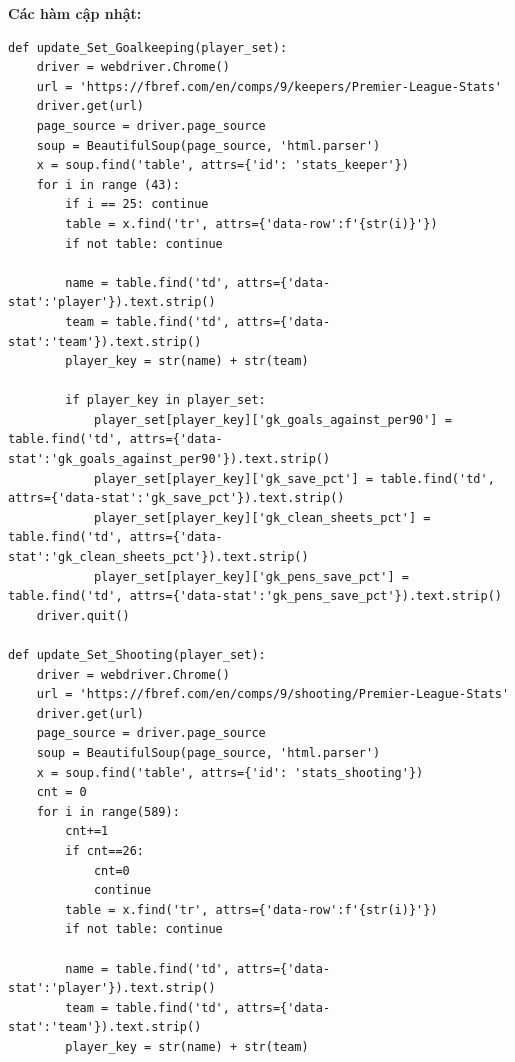 \documentclass[12pt]{report}
\begin{document}
{\textbf*{Các hàm cập nhật:}
\begin{lstlisting}
def update_Set_Goalkeeping(player_set):
    driver = webdriver.Chrome()
    url = 'https://fbref.com/en/comps/9/keepers/Premier-League-Stats'
    driver.get(url)
    page_source = driver.page_source
    soup = BeautifulSoup(page_source, 'html.parser')
    x = soup.find('table', attrs={'id': 'stats_keeper'})
    for i in range (43):
        if i == 25: continue
        table = x.find('tr', attrs={'data-row':f'{str(i)}'})
        if not table: continue

        name = table.find('td', attrs={'data-stat':'player'}).text.strip()
        team = table.find('td', attrs={'data-stat':'team'}).text.strip()
        player_key = str(name) + str(team)

        if player_key in player_set:
            player_set[player_key]['gk_goals_against_per90'] = table.find('td', attrs={'data-stat':'gk_goals_against_per90'}).text.strip()
            player_set[player_key]['gk_save_pct'] = table.find('td', attrs={'data-stat':'gk_save_pct'}).text.strip()
            player_set[player_key]['gk_clean_sheets_pct'] = table.find('td', attrs={'data-stat':'gk_clean_sheets_pct'}).text.strip()
            player_set[player_key]['gk_pens_save_pct'] = table.find('td', attrs={'data-stat':'gk_pens_save_pct'}).text.strip()
    driver.quit()

def update_Set_Shooting(player_set):
    driver = webdriver.Chrome()
    url = 'https://fbref.com/en/comps/9/shooting/Premier-League-Stats'
    driver.get(url)
    page_source = driver.page_source
    soup = BeautifulSoup(page_source, 'html.parser')
    x = soup.find('table', attrs={'id': 'stats_shooting'})
    cnt = 0
    for i in range(589):
        cnt+=1
        if cnt==26:
            cnt=0
            continue
        table = x.find('tr', attrs={'data-row':f'{str(i)}'})
        if not table: continue

        name = table.find('td', attrs={'data-stat':'player'}).text.strip()
        team = table.find('td', attrs={'data-stat':'team'}).text.strip()
        player_key = str(name) + str(team)


\end{lstlisting}}
\end{document}
